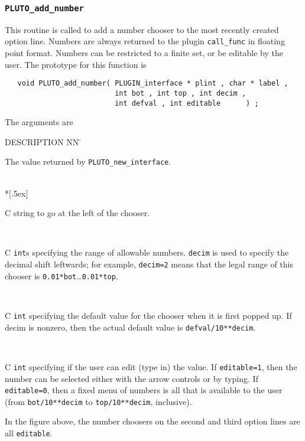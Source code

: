 \subsubsection{{\tt PLUTO\_add\_number}}
This routine is called to add a number chooser to the most recently created option line.
Numbers are always returned to the plugin {\tt call\_func} in floating point format.
Numbers can be restricted to a finite set, or be editable by the user.
The prototype for this function is
\begin{samepage}\begin{verbatim}
   void PLUTO_add_number( PLUGIN_interface * plint , char * label ,
                          int bot , int top , int decim ,
                          int defval , int editable      ) ;
\end{verbatim}\end{samepage}
\vset\noindent
The arguments are
\renewcommand{\tb}[1]{\parbox[t]{4.7in}{\sloppy #1}}
\begin{tabbing}
 \blob DESCRIPTION NN \= \kill
%
  \> \tb{The value returned by {\tt PLUTO\_new\_interface}.} \\*[.5ex]
%
  \> \tb{C string to go at the left of the chooser.} \\[.5ex]
%
   \> \tb{C {\tt int}s specifying the range of allowable numbers.
                                    {\tt decim} is used to specify the decimal shift
                                    leftwards; for example, {\tt decim=2} means that
                                    the legal range of this chooser is
                                    {\tt 0.01*bot}\ldots{\tt0.01*top}.} \\[.5ex]
%
  \> \tb{C {\tt int} specifying the default value for the chooser when
                          it is first popped up.  If decim is nonzero, then
                          the actual default value is {\tt defval/10**decim}.} \\[.5ex]
%
  \> \tb{C {\tt int} specifying if the user can edit (type in) the value.
                            If {\tt editable=1}, then the number can be selected either
                            with the arrow controls or by typing.  If {\tt editable=0}, then
                            a fixed menu of numbers is all that is available to the user
                            (from {\tt bot/10**decim} to {\tt top/10**decim}, inclusive).}
\end{tabbing}
In the figure above, the number choosers on the second and third option lines are
all {\tt editable}.

